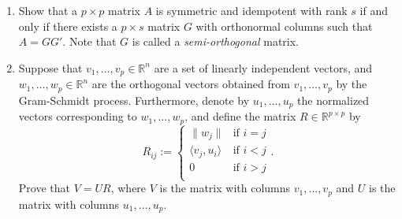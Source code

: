 \documentclass[11pt]{article}
\begin{document}
\begin{enumerate}
\item Show that a $p\times p$ matrix $A$ is symmetric and idempotent with rank $s$ if and only if there exists a $p\times s$ matrix $G$ with orthonormal columns such that $A = GG'$.  Note that $G$ is called a {\em semi-orthogonal} matrix.

\item Suppose that $v_{1},\dots,v_{p} \in \mathbb{R}^{n}$ are a set of linearly independent vectors, and $w_{1},\dots,w_{p} \in \mathbb{R}^{n}$ are the orthogonal vectors obtained from $v_{1},\dots,v_{p}$ by the Gram-Schmidt process.  Furthermore, denote by $u_{1},\dots,u_{p}$ the normalized vectors corresponding to $w_{1},\dots,w_{p}$, and define the matrix $R \in \mathbb{R}^{p\times p}$ by
\[
R_{ij} :=
\begin{cases}
\|w_{j}\| & \text{if } i=j \\
\langle v_{j}, u_i\rangle & \text{if } i<j \\
0 & \text{if } i>j \\
\end{cases}.
\]
Prove that $V = UR$, where $V$ is the matrix with columns $v_{1},\dots,v_{p}$ and $U$ is the matrix with columns $u_{1},\dots,u_{p}$.



\end{enumerate}
\end{document}
